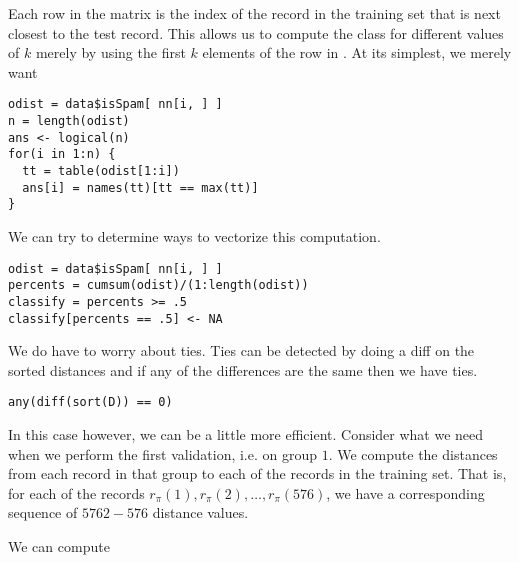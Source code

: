 Each row in the matrix  is the index of the record in the
training set that is next closest to the test record.  This allows us
to compute the class for different values of $k$ merely by using the
first $k$ elements of the row in .  At its simplest, we
merely want
\begin{verbatim}
odist = data$isSpam[ nn[i, ] ]
n = length(odist)
ans <- logical(n)
for(i in 1:n) {
  tt = table(odist[1:i])
  ans[i] = names(tt)[tt == max(tt)]
}
\end{verbatim}

We can try to determine ways to vectorize this computation.
\begin{verbatim}
odist = data$isSpam[ nn[i, ] ]
percents = cumsum(odist)/(1:length(odist))
classify = percents >= .5
classify[percents == .5] <- NA
\end{verbatim}

We do have to worry about ties.
Ties can be detected by doing a diff on the sorted
distances
and if any of the differences are the same
then we have ties.
\begin{verbatim}
any(diff(sort(D)) == 0)
\end{verbatim}




In this case however, we can be a little more efficient.  Consider
what we need when we perform the first validation, i.e. on group $1$.
We compute the distances from each record in that group to each of the
records in the training set.  That is, for each of the records
$r_\pi(1), r_\pi(2), \ldots, r_\pi(576)$, we have a corresponding
sequence of $5762-576$ distance values.




We can compute


